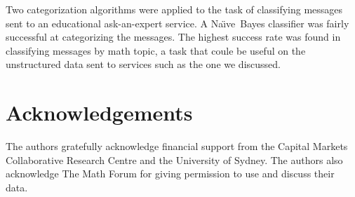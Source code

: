 \documentclass[twocolumn]{article}
\newcommand{\naive}{Na\"\i ve}
\begin{document}
Two categorization algorithms were applied to the task of classifying
messages sent to an educational ask-an-expert service.  A \naive\
Bayes classifier was fairly successful at categorizing the messages.
The highest success rate was found in classifying messages by math
topic, a task that coule be useful on the unstructured data sent to
services such as the one we discussed.

\section*{Acknowledgements}

The authors gratefully acknowledge financial support from the Capital Markets 
Collaborative Research Centre and the University of Sydney. The authors also 
acknowledge The Math Forum for giving permission to use and discuss their data. 



\end{document}

